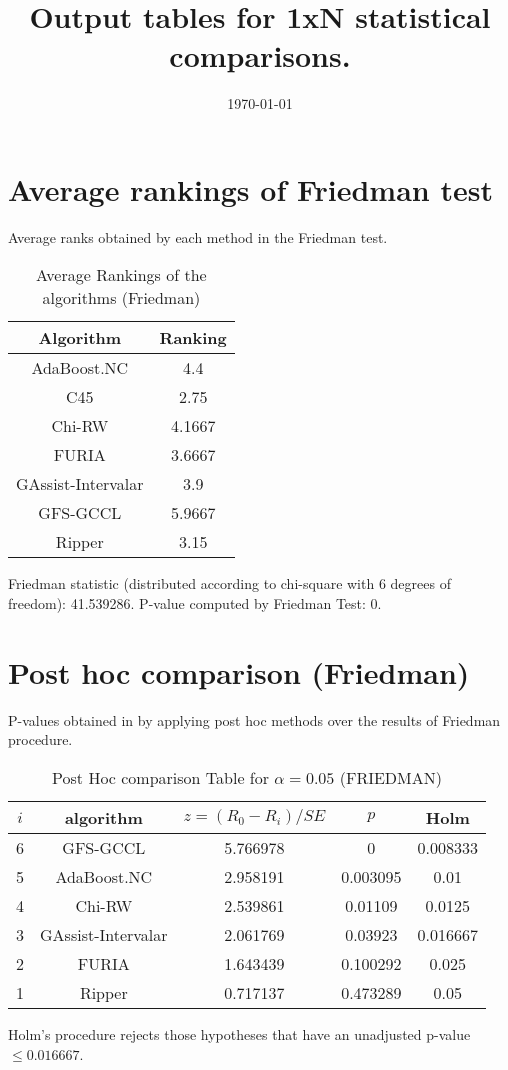 \documentclass[a4paper,10pt]{article}
\title{Output tables for 1xN statistical comparisons.}
\author{}
\date{\today}
\begin{document}
\pagestyle{empty}
\maketitle
\thispagestyle{empty}

\section{Average rankings of Friedman test}


Average ranks obtained by each method in the Friedman test.

\begin{table}[!htp]
\centering
\begin{tabular}{|c|c|}\hline
Algorithm&Ranking\\\hline
 AdaBoost.NC &4.4\\ C45 &2.75\\ Chi-RW &4.1667\\ FURIA &3.6667\\ GAssist-Intervalar &3.9\\ GFS-GCCL &5.9667\\ Ripper&3.15\\\hline\end{tabular}
\caption{Average Rankings of the algorithms (Friedman)}
\end{table}

Friedman statistic (distributed according to chi-square with 6 degrees of freedom): 41.539286. \newline P-value computed by Friedman Test: 0.\newline


\newpage

\section{Post hoc comparison (Friedman)}


P-values obtained in by applying post hoc methods over the results of Friedman procedure.

\begin{table}[!htp]
\centering\footnotesize
\begin{tabular}{ccccc}
$i$&algorithm&$z=(R_0 - R_i)/SE$&$p$&Holm \\
\hline6& GFS-GCCL &5.766978&0&0.008333\\5& AdaBoost.NC &2.958191&0.003095&0.01\\4& Chi-RW &2.539861&0.01109&0.0125\\3& GAssist-Intervalar &2.061769&0.03923&0.016667\\2& FURIA &1.643439&0.100292&0.025\\1& Ripper&0.717137&0.473289&0.05\\\hline
\end{tabular}
\caption{Post Hoc comparison Table for $\alpha=0.05$ (FRIEDMAN)}
\end{table}Holm's procedure rejects those hypotheses that have an unadjusted p-value $\le0.016667$.
\end{document}
